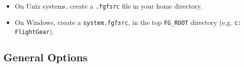 \begin{itemize}
\item On Unix systems, create a \texttt{.fgfsrc} file in your home directory.
\item On Windows, create a \texttt{system.fgfsrc}, in
the top \texttt{FG\_ROOT} directory (e.g. \texttt{c:\\FlightGear}). 
\end{itemize}

\subsection{General Options}\label{generaloptions}
